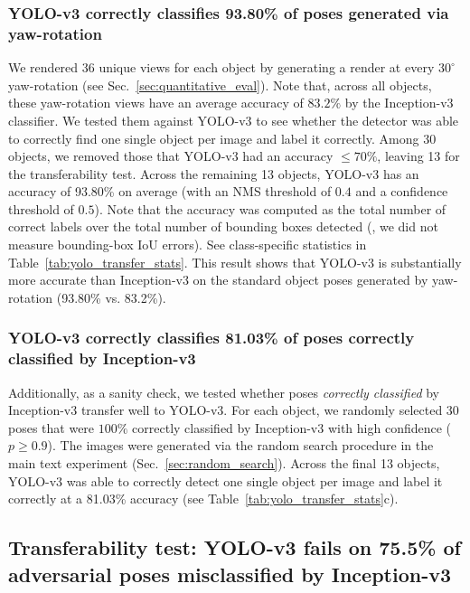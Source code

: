 \documentclass[10pt,twocolumn,letterpaper]{article}
\begin{document}
\subsubsection{YOLO-v3 correctly classifies 93.80\% of poses generated via yaw-rotation}
We rendered 36 unique views for each object by generating a render at every $30^\circ{}$ yaw-rotation (see Sec.~\ref{sec:quantitative_eval}).
Note that, across all objects, these yaw-rotation views have an average accuracy of $83.2\%$ by the Inception-v3 classifier.
We tested them against YOLO-v3 to see whether the detector was able to correctly find one single object per image and label it correctly.
Among 30 objects, we removed those that YOLO-v3 had an accuracy $\leq 70\%$, leaving 13 for the transferability test.
Across the remaining 13 objects, YOLO-v3 has an accuracy of 93.80\% on average (with an NMS threshold of $0.4$ and a confidence threshold of $0.5$).
Note that the accuracy was computed as the total number of correct labels over the total number of bounding boxes detected (\ie, we did not measure bounding-box IoU errors).
See class-specific statistics in Table~\ref{tab:yolo_transfer_stats}.
This result shows that YOLO-v3 is substantially more accurate than Inception-v3 on the standard object poses generated by yaw-rotation (93.80\% vs. 83.2\%).

\subsubsection{YOLO-v3 correctly classifies 81.03\% of poses correctly classified by Inception-v3}

Additionally, as a sanity check, we tested whether poses \emph{correctly classified} by Inception-v3 transfer well to YOLO-v3.
For each object, we randomly selected 30 poses that were $100\%$ correctly classified by Inception-v3 with high confidence ($p \geq 0.9$).
The images were generated via the random search procedure in the main text experiment (Sec.~\ref{sec:random_search}).
Across the final 13 objects, YOLO-v3 was able to correctly detect one single object per image and label it correctly at a 81.03\% accuracy (see Table~\ref{tab:yolo_transfer_stats}c).


\subsection{Transferability test: YOLO-v3 fails on 75.5\% of adversarial poses misclassified by Inception-v3}
\label{sec:transferability}
\end{document}
